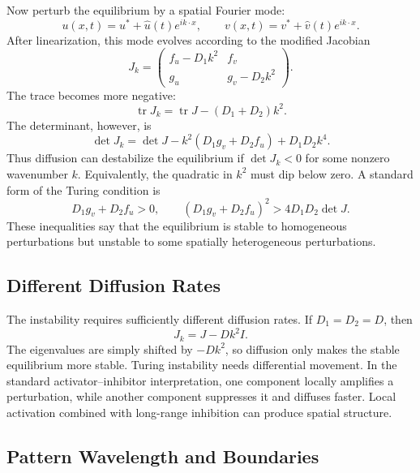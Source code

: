 \documentclass[12pt,letterpaper]{article}
\numberwithin{equation}{section}
\begin{document}
Now perturb the equilibrium by a spatial Fourier mode:
\begin{equation}
    u(x,t)=u^*+\widehat u(t)e^{i k\cdot x},
    \qquad
    v(x,t)=v^*+\widehat v(t)e^{i k\cdot x}.
\end{equation}
After linearization, this mode evolves according to the modified Jacobian
\begin{equation}
    J_k=
    \begin{pmatrix}
        f_u-D_1k^2 & f_v\\
        g_u & g_v-D_2k^2
    \end{pmatrix}.
\end{equation}
The trace becomes more negative:
\begin{equation}
    \operatorname{tr}J_k=\operatorname{tr}J-(D_1+D_2)k^2.
\end{equation}
The determinant, however, is
\begin{equation}
    \det J_k
    =
    \det J
    -
    k^2(D_1g_v+D_2f_u)
    +
    D_1D_2k^4.
\end{equation}
Thus diffusion can destabilize the equilibrium if $\det J_k<0$ for some nonzero
wavenumber $k$. Equivalently, the quadratic in $k^2$ must dip below zero. A standard
form of the Turing condition is
\begin{equation}
    D_1g_v+D_2f_u>0,
    \qquad
    (D_1g_v+D_2f_u)^2>4D_1D_2\det J.
\end{equation}
These inequalities say that the equilibrium is stable to homogeneous perturbations
but unstable to some spatially heterogeneous perturbations.

\subsection{Different Diffusion Rates}

The instability requires sufficiently different diffusion rates. If $D_1=D_2=D$, then
\begin{equation}
    J_k=J-Dk^2I.
\end{equation}
The eigenvalues are simply shifted by $-Dk^2$, so diffusion only makes the stable
equilibrium more stable. Turing instability needs differential movement. In the
standard activator--inhibitor interpretation, one component locally amplifies a
perturbation, while another component suppresses it and diffuses faster. Local
activation combined with long-range inhibition can produce spatial structure.

\subsection{Pattern Wavelength and Boundaries}
\end{document}
